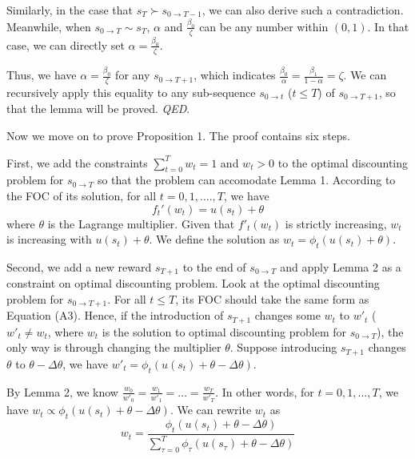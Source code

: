 \documentclass[
  12pt,
]{article}
\begin{document}
Similarly, in the case that \(s_T \succ s_{0 \rightarrow T-1}\), we can
also derive such a contradiction. Meanwhile, when
\(s_{0\rightarrow T}\sim s_T\), \(\alpha\) and \(\frac{\beta_0}{\zeta}\)
can be any number within \((0,1)\). In that case, we can directly set
\(\alpha = \frac{\beta_0}{\zeta}\).

Thus, we have \(\alpha = \frac{\beta_0}{\zeta}\) for any
\(s_{0\rightarrow T+1}\), which indicates
\(\frac{\beta_0}{\alpha}=\frac{\beta_1}{1-\alpha}=\zeta\). We can
recursively apply this equality to any sub-sequence
\(s_{0\rightarrow t}\) (\(t\leq T\)) of \(s_{0\rightarrow T+1}\), so
that the lemma will be proved. \emph{QED}.

Now we move on to prove Proposition 1. The proof contains six steps.

First, we add the constraints \(\sum_{t=0}^T w_t=1\) and \(w_t>0\) to
the optimal discounting problem for \(s_{0\rightarrow T}\) so that the
problem can accomodate Lemma 1. According to the FOC of its solution,
for all \(t=0,1,….,T\), we have\[\tag{A3}
f_t'(w_t)=u(s_t)+\theta
\]where \(\theta\) is the Lagrange multiplier. Given that \(f'_t(w_t)\)
is strictly increasing, \(w_t\) is increasing with \(u(s_t)+\theta\). We
define the solution as \(w_t =\phi_t(u(s_t)+\theta)\).

Second, we add a new reward \(s_{T+1}\) to the end of
\(s_{0\rightarrow T}\) and apply Lemma 2 as a constraint on optimal
discounting problem. Look at the optimal discounting problem for
\(s_{0\rightarrow T+1}\). For all \(t\leq T\), its FOC should take the
same form as Equation (A3). Hence, if the introduction of \(s_{T+1}\)
changes some \(w_t\) to \(w'_t\) (\(w'_t \neq w_t\), where \(w_t\) is
the solution to optimal discounting problem for \(s_{0\rightarrow T}\)),
the only way is through changing the multiplier \(\theta\). Suppose
introducing \(s_{T+1}\) changes \(\theta\) to \(\theta-\Delta \theta\),
we have \(w'_t = \phi_t(u(s_t)+\theta-\Delta \theta)\).

By Lemma 2, we know
\(\frac{w_0}{w'_0}=\frac{w_1}{w'_1}=…=\frac{w_T}{w'_T}\). In other
words, for \(t=0,1,…,T\), we have
\(w_t \propto \phi_t(u(s_t)+\theta-\Delta \theta)\). We can rewrite
\(w_t\) as \[\tag{A4}
w_t = \frac{\phi_t(u(s_t)+\theta-\Delta \theta)}{\sum_{\tau=0}^{T}\phi_\tau(u(s_\tau)+\theta-\Delta \theta)}
\]
\end{document}
